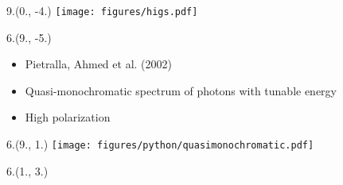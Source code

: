 \begin{textblock}{9.}(0., -4.)
    \texttt{[image: figures/higs.pdf]}
\end{textblock}

\begin{textblock}{6.}(9., -5.)
    \begin{itemize}
        \item Pietralla, Ahmed et al. (2002)
        \item Quasi-monochromatic spectrum of photons with tunable energy
        \item High polarization
    \end{itemize}
\end{textblock}

\def \SPECTRUMX {9.}
\def \SPECTRUMY {1.}

\begin{textblock}{6.}(\SPECTRUMX, \SPECTRUMY)
    \texttt{[image: figures/python/quasimonochromatic.pdf]}
\end{textblock}

\begin{textblock}{6.}(1., 3.)
\end{textblock}